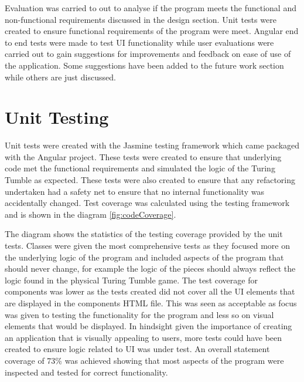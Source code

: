 \documentclass{l4proj}
\begin{document}
Evaluation was carried to out to analyse if the program meets the functional and non-functional requirements discussed in the design section. Unit tests were created to ensure functional requirements of the program were meet. Angular end to end tests were made to test UI functionality while user evaluations were carried out to gain suggestions for improvements and feedback on ease of use of the application. Some suggestions have been added to the future work section while others are just discussed. 

\section{Unit Testing}
Unit tests were created with the Jasmine testing framework which came packaged with the Angular project. These tests were created to ensure that underlying code met the functional requirements and simulated the logic of the Turing Tumble as expected. These tests were also created to ensure that any refactoring undertaken had a safety net to ensure that no internal functionality was accidentally changed. Test coverage was calculated using the testing framework and is shown in the diagram \ref{fig:codeCoverage}. 

The diagram shows the statistics of the testing coverage provided by the unit tests. Classes were given the most comprehensive tests as they focused more on the underlying logic of the program and included aspects of the program that should never change, for example the logic of the pieces should always reflect the logic found in the physical Turing Tumble game. The test coverage for components was lower as the tests created did not cover all the UI elements that are displayed in the components HTML file. This was seen as acceptable as focus was given to testing the functionality for the program and less so on visual elements that would be displayed. In hindsight given the importance of creating an application that is visually appealing to users, more tests could have been created to ensure logic related to UI was under test. An overall statement coverage of 73\% was achieved showing that most aspects of the program were inspected and tested for correct functionality.
\end{document}

